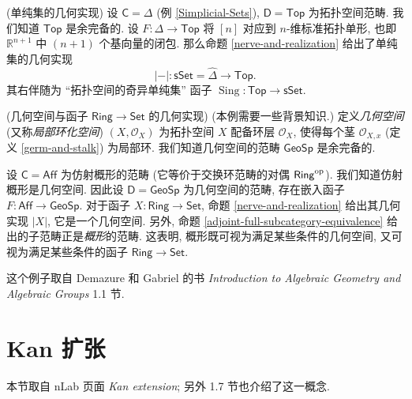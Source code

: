 \begin{example}
	{(单纯集的几何实现)}
	设 $\mathsf C = \Delta$ (例 \ref{Simplicial-Sets}),
	$\mathsf D=\mathsf {Top}$ 为拓扑空间范畴.
	我们知道 $\mathsf {Top}$ 是余完备的.
	设 $F \colon \Delta \to \mathsf {Top}$ 将 $[n]$ 对应到 $n$-维标准拓扑单形, 也即 $\mathbb{R}^{n+1}$ 中 $(n+1)$ 个基向量的闭包.
	那么命题 \ref{nerve-and-realization} 给出了单纯集的几何实现
	$$
	|{-}|\colon \mathsf {sSet} = \widehat {\Delta} \to \mathsf {Top}.
	$$
	其右伴随为 ``拓扑空间的奇异单纯集'' 函子 $\operatorname{Sing}\colon \mathsf {Top}\to \mathsf {sSet}$.
\end{example}

\begin{example}
	{(几何空间与函子 $\mathsf {Ring}\to\mathsf {Set}$ 的几何实现)}
	{\small (本例需要一些背景知识.)} 定义\emph{几何空间} (又称\emph{局部环化空间}) $(X,\mathcal O_X)$ 为拓扑空间 $X$ 配备环层 $\mathcal O_X$, 使得每个茎 $\mathcal O_{X,x}$ (定义 \ref{germ-and-stalk}) 为局部环.
	我们知道几何空间的范畴 $\mathsf {GeoSp}$ 是余完备的.
	
	设 $\mathsf C = \mathsf {Aff}$ 为仿射概形的范畴 (它等价于交换环范畴的对偶 $\mathsf {Ring}^{\text{op}}$).
	我们知道仿射概形是几何空间. 因此设 $\mathsf D = \mathsf {GeoSp}$ 为几何空间的范畴, 存在嵌入函子 $F\colon \mathsf {Aff}\to\mathsf {GeoSp}$.
	对于函子 $X\colon \mathsf {Ring} \to\mathsf {Set}$,
	命题 \ref{nerve-and-realization} 给出其几何实现 $|X|$, 它是一个几何空间.
	另外, 命题 \ref{adjoint-full-subcategory-equivalence} 给出的子范畴正是\emph{概形}的范畴. 这表明, 概形既可视为满足某些条件的几何空间, 又可视为满足某些条件的函子 $\mathsf {Ring}\to\mathsf {Set}$.
	
	这个例子取自 Demazure 和 Gabriel 的书 \emph{Introduction to Algebraic Geometry and Algebraic Groups} 1.1 节.
\end{example}

\section{Kan 扩张}


本节取自 nLab 页面 \emph{Kan extension}; 另外 \cite{lww2} 1.7 节也介绍了这一概念.

